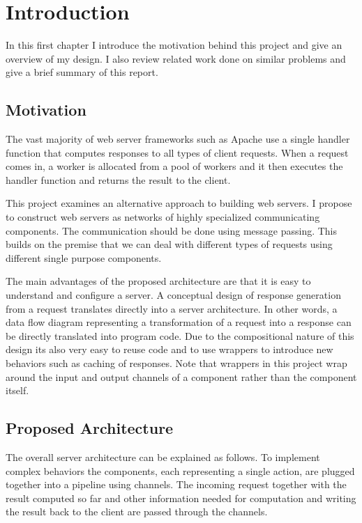 \section{Introduction}
In this first chapter I introduce the motivation behind this project and 
give an overview of my design. I also review related work done on similar
problems and give a brief summary of this report. 

\subsection{Motivation}
The vast majority of web server frameworks such as Apache
use a single handler function that
computes responses to all types of client requests. When a request comes in, a 
worker is allocated from a pool of workers and it then executes the handler function
and returns the result to the client.

This project examines an alternative approach to building web servers. 
I propose to construct web servers as networks of highly specialized 
communicating components. The communication should be done using
message passing. This builds on the premise that we can deal
with different types of requests using different single purpose components.

The main advantages of the proposed architecture are that it is easy to understand
and configure a server. A conceptual design of response generation from a request translates 
directly into a server architecture. In other words, a data flow diagram 
representing a transformation
of a request into a response can be directly translated into program code.
Due to the compositional nature of this design its also very easy to reuse code
and to use wrappers to introduce new behaviors such as caching of responses.
Note that wrappers in this project wrap around the input and output channels
of a component rather than the component itself.

\subsection{Proposed Architecture}
The overall server architecture can be explained as follows.
To implement complex behaviors the components, each representing 
a single action, are plugged together into a pipeline using channels. 
The incoming
request together with the result computed so far and other 
information needed for computation and writing the result back to the client
are passed through the channels.


